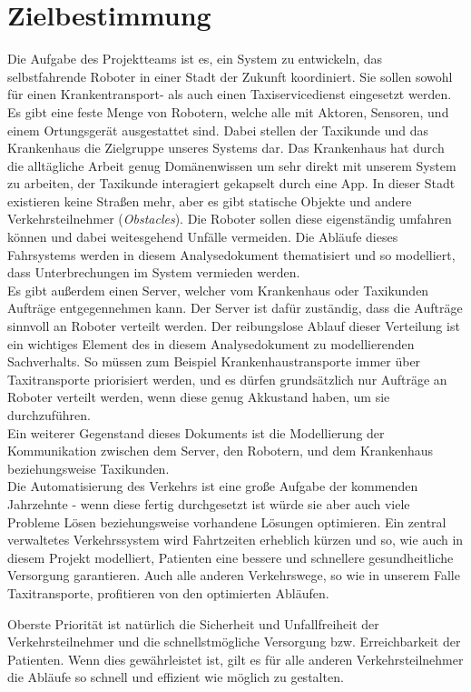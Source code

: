 
\section{Zielbestimmung}
Die Aufgabe des Projektteams ist es, ein System zu entwickeln, das selbstfahrende Roboter in einer Stadt der Zukunft koordiniert. 
Sie sollen sowohl für einen Krankentransport- als auch einen Taxiservicedienst eingesetzt werden. \\
Es gibt eine feste Menge von Robotern, welche alle mit Aktoren, Sensoren, und einem Ortungsgerät ausgestattet sind. Dabei stellen der Taxikunde und das Krankenhaus die Zielgruppe unseres Systems dar. 
Das Krankenhaus hat durch die alltägliche Arbeit genug Domänenwissen um sehr direkt mit unserem System zu arbeiten, der Taxikunde interagiert gekapselt durch eine App.
In dieser Stadt existieren keine Straßen mehr, aber es gibt statische Objekte und andere Verkehrsteilnehmer (\textit{Obstacles}). 
Die Roboter sollen diese  eigenständig umfahren können und dabei weitesgehend Unfälle vermeiden. 
Die Abläufe dieses Fahrsystems werden in diesem Analysedokument thematisiert und so modelliert, dass Unterbrechungen im System vermieden werden.\\ 
Es gibt außerdem einen Server, welcher vom Krankenhaus oder Taxikunden Aufträge entgegennehmen kann. 
Der Server ist dafür zuständig, dass die Aufträge sinnvoll an Roboter verteilt werden. 
Der reibungslose Ablauf dieser Verteilung ist ein wichtiges Element des in diesem Analysedokument zu modellierenden Sachverhalts. 
So müssen zum Beispiel Krankenhaustransporte immer über Taxitransporte priorisiert werden, und es dürfen grundsätzlich nur Aufträge an Roboter verteilt werden, wenn diese genug Akkustand haben, um sie durchzuführen.\\
Ein weiterer Gegenstand dieses Dokuments ist die Modellierung der Kommunikation zwischen dem Server, den Robotern, und dem Krankenhaus beziehungsweise Taxikunden.\\

Die Automatisierung des Verkehrs ist eine große Aufgabe der kommenden Jahrzehnte - wenn diese fertig durchgesetzt ist würde sie aber auch viele Probleme Lösen beziehungsweise vorhandene Lösungen optimieren. Ein zentral verwaltetes Verkehrssystem wird Fahrtzeiten erheblich kürzen und so, wie auch in diesem Projekt modelliert, Patienten eine bessere und schnellere gesundheitliche Versorgung garantieren. Auch alle anderen Verkehrswege, so wie in unserem Falle Taxitransporte, profitieren von den optimierten Abläufen.

Oberste Priorität ist natürlich die Sicherheit und Unfallfreiheit der Verkehrsteilnehmer und die schnellstmögliche Versorgung bzw. Erreichbarkeit der Patienten. Wenn dies gewährleistet ist, gilt es für alle anderen Verkehrsteilnehmer die Abläufe so schnell und effizient wie möglich zu gestalten.\\


\pagebreak
